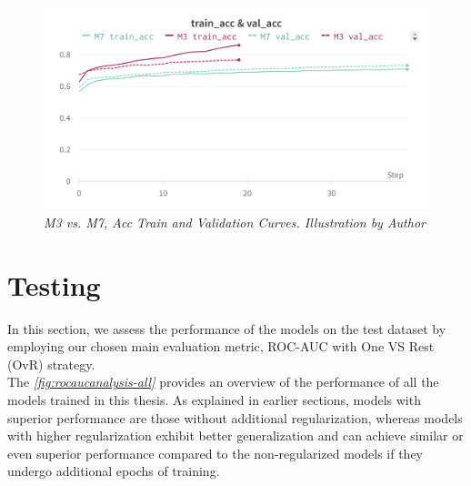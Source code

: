 \newpage

\begin{figure}[H]
\centering
    \includegraphics[width=\textwidth]{imatges/results/AccM3M7.png}
\caption[M3 vs. M7, Acc Train and Validation Curves]{\textit{M3 vs. M7, Acc Train and Validation Curves. Illustration by Author}}
\end{figure}


\newpage

\section{Testing}

In this section, we assess the performance of the models on the test dataset by employing our chosen main evaluation metric,
ROC-AUC with One VS Rest (OvR) strategy. \\

The \textit{\ref{fig:rocaucanalysis-all}} provides an overview of the performance of all the models trained in this thesis.
As explained in earlier sections, models with superior performance are those without additional regularization,
whereas models with higher regularization exhibit better generalization and can achieve similar
or even superior performance compared to the non-regularized models if they undergo additional epochs of training.

